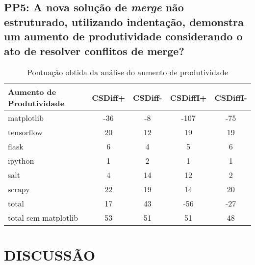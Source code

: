 \subsection{PP5: A nova solução de \emph{merge} não estruturado, utilizando indentação,
	demonstra um aumento de produtividade considerando o ato de resolver conflitos de merge?}

\begin{table}[ht]
	\begin{center}
		\begin{tabular}{|l|c|c|c|c|}
			\hline
			\textbf{Aumento de Produtividade} & \textbf{CSDiff+} & \textbf{CSDiff-} & \textbf{CSDiffI+} & \textbf{CSDiffI-} \\
			\hline
			matplotlib                        & -36              & -8               & -107              & -75               \\
			tensorflow                        & 20               & 12               & 19                & 19                \\
			flask                             & 6                & 4                & 5                 & 6                 \\
			ipython                           & 1                & 2                & 1                 & 1                 \\
			salt                              & 4                & 14               & 12                & 2                 \\
			scrapy                            & 22               & 19               & 14                & 20                \\
			total                             & 17               & 43               & -56               & -27               \\
			total sem matplotlib              & 53               & 51               & 51                & 48                \\
			\hline
		\end{tabular}
	\end{center}
	\caption{Pontuação obtida da análise do aumento de produtividade}\label{tabela_produtividade}
\end{table}
\section{DISCUSSÃO}\label{discussao}
